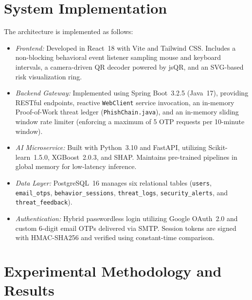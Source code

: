 \documentclass[conference]{IEEEtran}
\begin{document}
\section{System Implementation}

The architecture is implemented as follows:
\begin{itemize}[leftmargin=*,nosep]
\item \textit{Frontend:} Developed in React~18 with Vite and Tailwind CSS.
      Includes a non-blocking behavioral event listener sampling mouse and keyboard intervals,
      a camera-driven QR decoder powered by jsQR, and an SVG-based risk visualization ring.
\item \textit{Backend Gateway:} Implemented using Spring Boot~3.2.5 (Java~17), providing RESTful endpoints,
      reactive \texttt{WebClient} service invocation, an in-memory Proof-of-Work threat ledger
      (\texttt{PhishChain.java}), and an in-memory sliding window rate limiter (enforcing a maximum of
      5 OTP requests per 10-minute window).
\item \textit{AI Microservice:} Built with Python~3.10 and FastAPI, utilizing Scikit-learn~1.5.0,
      XGBoost~2.0.3, and SHAP.
      Maintains pre-trained pipelines in global memory for low-latency inference.
\item \textit{Data Layer:} PostgreSQL~16 manages six relational tables (\texttt{users}, \texttt{email\_otps},
      \texttt{behavior\_sessions}, \texttt{threat\_logs}, \texttt{security\_alerts}, and \texttt{threat\_feedback}).
\item \textit{Authentication:} Hybrid passwordless login utilizing Google OAuth~2.0 and custom 6-digit
      email OTPs delivered via SMTP.
      Session tokens are signed with HMAC-SHA256 and verified using constant-time comparison.
\end{itemize}

\section{Experimental Methodology and Results}
\end{document}
